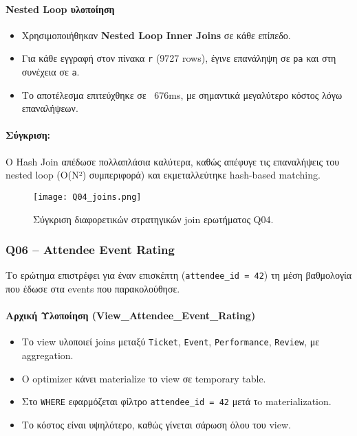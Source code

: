 \documentclass[13pt]{extarticle}
\begin{document}
\paragraph{Nested Loop υλοποίηση}
\begin{itemize}
    \item Χρησιμοποιήθηκαν \textbf{Nested Loop Inner Joins} σε κάθε επίπεδο.
    \item Για κάθε εγγραφή στον πίνακα \texttt{r} (9727 rows), έγινε επανάληψη σε \texttt{pa} και στη συνέχεια σε \texttt{a}.
    \item Το αποτέλεσμα επιτεύχθηκε σε ~676ms, με σημαντικά μεγαλύτερο κόστος λόγω επαναλήψεων.
\end{itemize}

\paragraph{Σύγκριση:}  
Ο Hash Join απέδωσε πολλαπλάσια καλύτερα, καθώς απέφυγε τις επαναλήψεις του nested loop (O(N²) συμπεριφορά) και εκμεταλλεύτηκε hash-based matching.

\begin{figure}[H]
    \centering
    \texttt{[image: Q04\_joins.png]}
    \caption{Σύγκριση διαφορετικών στρατηγικών join ερωτήματος Q04.}
\end{figure}

\subsubsection{Q06 – Attendee Event Rating}

Το ερώτημα επιστρέφει για έναν επισκέπτη (\texttt{attendee\_id = 42}) τη μέση βαθμολογία που έδωσε στα events που παρακολούθησε.

\paragraph{Αρχική Υλοποίηση (View\_Attendee\_Event\_Rating)}
\begin{itemize}
    \item Το view υλοποιεί joins μεταξύ \texttt{Ticket}, \texttt{Event}, \texttt{Performance}, \texttt{Review}, με aggregation.
    \item Ο optimizer κάνει materialize το view σε temporary table.
    \item Στο \texttt{WHERE} εφαρμόζεται φίλτρο \texttt{attendee\_id = 42} μετά τo materialization.
    \item Το κόστος είναι υψηλότερο, καθώς γίνεται σάρωση όλου του view.
\end{itemize}
\end{document}
